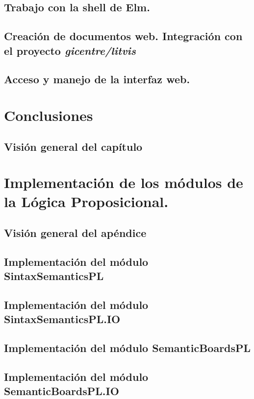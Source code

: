 \documentclass[fleqn, 11pt, a4paper]{book}
\begin{document}
\minitoc

\newpage

\section{Trabajo con la shell de Elm.}
\section{Creación de documentos web. Integración con el proyecto \textit{gicentre/litvis}}
\section{Acceso y manejo de la interfaz web.}

\chapter{Conclusiones}

\minitoc

\newpage
\section{Visión general del capítulo}


\appendix
{}

\chapter{Implementación de los módulos de la Lógica Proposicional.}

\minitoc

\section{Visión general del apéndice}
\section{Implementación del módulo SintaxSemanticsPL}
\section{Implementación del módulo SintaxSemanticsPL.IO}
\section{Implementación del módulo SemanticBoardsPL}
\section{Implementación del módulo SemanticBoardsPL.IO}
\end{document}
